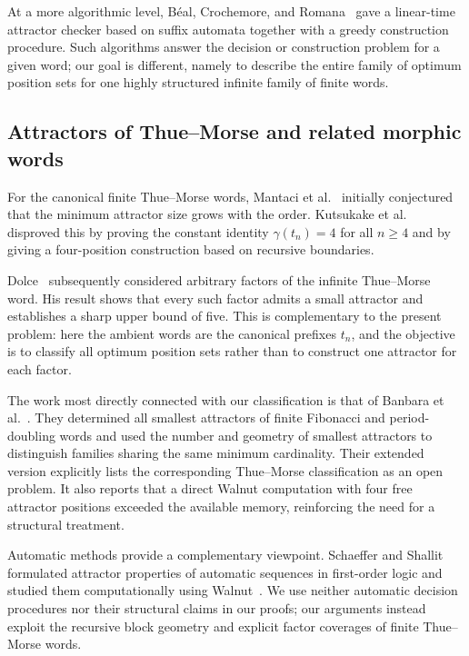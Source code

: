 \documentclass[11pt,a4paper]{article}
\theoremstyle{definition}\newtheorem{definition}[theorem]{Definition}
\theoremstyle{remark}\newtheorem{remark}[theorem]{Remark}
\begin{document}
At a more algorithmic level, B\'eal, Crochemore, and Romana~\cite{Beal2025} gave a linear-time attractor checker based on suffix automata together with a greedy construction procedure. Such algorithms answer the decision or construction problem for a given word; our goal is different, namely to describe the entire family of optimum position sets for one highly structured infinite family of finite words.

\subsection{Attractors of Thue--Morse and related morphic words}
For the canonical finite Thue--Morse words, Mantaci et al.~\cite{Mantaci2019} initially conjectured that the minimum attractor size grows with the order. Kutsukake et al.~\cite{Kutsukake2020} disproved this by proving the constant identity $\gamma(t_n)=4$ for all $n\ge4$ and by giving a four-position construction based on recursive boundaries.

Dolce~\cite{Dolce2023} subsequently considered arbitrary factors of the infinite Thue--Morse word. His result shows that every such factor admits a small attractor and establishes a sharp upper bound of five. This is complementary to the present problem: here the ambient words are the canonical prefixes $t_n$, and the objective is to classify all optimum position sets rather than to construct one attractor for each factor.

The work most directly connected with our classification is that of Banbara et al.~\cite{Banbara2026}. They determined all smallest attractors of finite Fibonacci and period-doubling words and used the number and geometry of smallest attractors to distinguish families sharing the same minimum cardinality. Their extended version explicitly lists the corresponding Thue--Morse classification as an open problem. It also reports that a direct Walnut computation with four free attractor positions exceeded the available memory, reinforcing the need for a structural treatment.

Automatic methods provide a complementary viewpoint. Schaeffer and Shallit~\cite{Schaeffer20} formulated attractor properties of automatic sequences in first-order logic and studied them computationally using Walnut~\cite{Mousavi2016}. We use neither automatic decision procedures nor their structural claims in our proofs; our arguments instead exploit the recursive block geometry and explicit factor coverages of finite Thue--Morse words.
\end{document}
